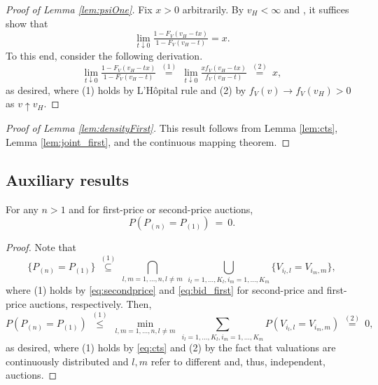 \begin{proof}[Proof of Lemma \ref{lem:psiOne}]
Fix $x>0$ arbitrarily. By $v_H<\infty $ and \citet[Theorem 1.2.1]{dehaan2006book}, it suffices show that 
\begin{equation*}
\lim_{t\downarrow 0}\tfrac{1-F_{V}(v_H-tx)}{1-F_{V}(v_H-t)}=x.
\end{equation*}%
To this end, consider the following derivation.
\begin{equation*}
\lim_{t\downarrow 0}\tfrac{1-F_{V}(v_H-tx)}{1-F_{V}(v_H-t)}%
~\overset{(1)}{=}~\lim_{t\downarrow 0}\tfrac{xf_{V}(v_H-tx)}{f_{V}(v_H-t)}%
~\overset{(2)}{=}~x,
\end{equation*}%
as desired, where (1) holds by L'H\^{o}pital rule and (2) by $f_{V}( v) \to f_{V}( v_H)>0 $ as $v\uparrow v_H$.
\end{proof}


\begin{proof}[Proof of Lemma \ref{lem:densityFirst}]
This result follows from Lemma \ref{lem:cts}, Lemma \ref{lem:joint_first}, and the continuous mapping theorem.
\end{proof}

\subsection{Auxiliary results}\label{sec:appendix-aux}

\begin{lemma}\label{lem:cts}
For any $n>1$ and for first-price or second-price auctions, 
\begin{equation*}
P(P_{(n)}=P_{(1)})~=~0.
\end{equation*}
\end{lemma}
\begin{proof}
Note that 
\begin{equation}
\{ P_{(n)}=P_{(1)}\} ~\overset{(1)}{\subseteq }~\underset{l,m=1,\ldots,n,l\neq  m}{\bigcap}~\underset{i_{l}=1,\ldots ,K_{l},i_{m}=1,\ldots ,K_{m}}{\bigcup}\{V_{i_{l},l}=V_{i_{m},m}\} ,  \label{eq:cts}
\end{equation}%
where (1) holds by \eqref{eq:secondprice} and \eqref{eq:bid_first} for second-price and first-price auctions, respectively. Then, 
\begin{equation*}
P(P_{(n)}=P_{(1)})~\overset{(1)}{\leq }~\min_{l,m=1,\ldots,n,l\neq m}~\sum_{i_{l}=1,\ldots ,K_{l},i_{m}=1,\ldots ,K_{m}}P(V_{i_{l},l}=V_{i_{m},m}) ~\overset{(2)}{=}~0,
\end{equation*}%
as desired, where (1) holds by \eqref{eq:cts} and (2) by the fact that valuations are continuously distributed and $l,m$ refer to different and, thus, independent, auctions.
\end{proof}

